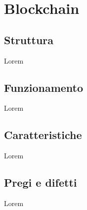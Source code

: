 
\chapter{Blockchain}
\label{cap:blockchain}

\section{Struttura}

Lorem

\section{Funzionamento}

Lorem

\section{Caratteristiche}

Lorem

\section{Pregi e difetti}

Lorem
